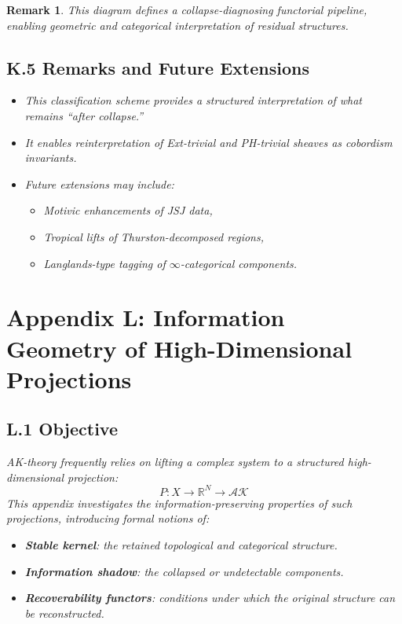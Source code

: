 \documentclass[11pt]{article}
\newtheorem{remark}[theorem]{Remark}
\begin{document}
\begin{remark}
This diagram defines a collapse-diagnosing functorial pipeline, enabling geometric and categorical interpretation of residual structures.

\subsection*{K.5 Remarks and Future Extensions}

\begin{itemize}
  \item This classification scheme provides a structured interpretation of what remains “after collapse.”
  \item It enables reinterpretation of Ext-trivial and PH-trivial sheaves as cobordism invariants.
  \item Future extensions may include:
  \begin{itemize}
    \item Motivic enhancements of JSJ data,
    \item Tropical lifts of Thurston-decomposed regions,
    \item Langlands-type tagging of $\infty$-categorical components.
  \end{itemize}
\end{itemize}



\section*{Appendix L: Information Geometry of High-Dimensional Projections}

\subsection*{L.1 Objective}

AK-theory frequently relies on lifting a complex system to a structured high-dimensional projection:
\[
P: X \longrightarrow \mathbb{R}^N \longrightarrow \mathcal{AK}
\]
This appendix investigates the information-preserving properties of such projections, introducing formal notions of:
\begin{itemize}
  \item \textbf{Stable kernel}: the retained topological and categorical structure.
  \item \textbf{Information shadow}: the collapsed or undetectable components.
  \item \textbf{Recoverability functors}: conditions under which the original structure can be reconstructed.
\end{itemize}


\end{remark}
\end{document}
